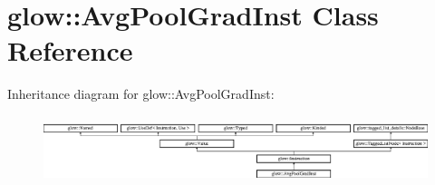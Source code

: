 \hypertarget{classglow_1_1_avg_pool_grad_inst}{}\section{glow\+:\+:Avg\+Pool\+Grad\+Inst Class Reference}
\label{classglow_1_1_avg_pool_grad_inst}
Inheritance diagram for glow\+:\+:Avg\+Pool\+Grad\+Inst\+:\begin{figure}[H]
\begin{center}
\leavevmode
\includegraphics[height=1.991111cm]{classglow_1_1_avg_pool_grad_inst}
\end{center}
\end{figure}
